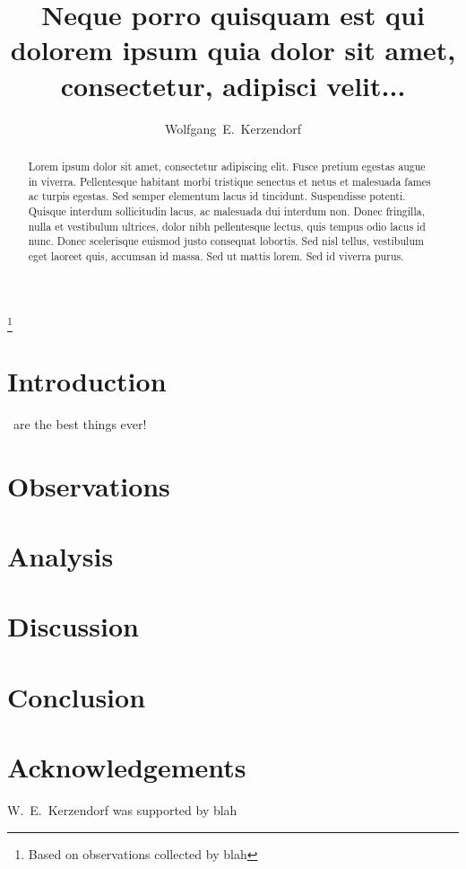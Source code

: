 \documentclass[manuscript]{aastex}
\begin{document}
\title{Neque porro quisquam est qui dolorem ipsum quia dolor sit amet, consectetur, adipisci velit...}
\footnote{Based on observations collected by blah}

\author{Wolfgang~E.~Kerzendorf} 




\begin{abstract}
Lorem ipsum dolor sit amet, consectetur adipiscing elit. Fusce pretium egestas augue in viverra. Pellentesque habitant morbi tristique senectus et netus et malesuada fames ac turpis egestas. Sed semper elementum lacus id tincidunt. Suspendisse potenti. Quisque interdum sollicitudin lacus, ac malesuada dui interdum non. Donec fringilla, nulla et vestibulum ultrices, dolor nibh pellentesque lectus, quis tempus odio lacus id nunc. Donec scelerisque euismod justo consequat lobortis. Sed nisl tellus, vestibulum eget laoreet quis, accumsan id massa. Sed ut mattis lorem. Sed id viverra purus.
\end{abstract}


\maketitle

\section{Introduction}

\sneia\ are the best things ever!


\section{Observations}

\section{Analysis}

\section{Discussion}

\section{Conclusion}

\section{Acknowledgements}

W.~E.~Kerzendorf was supported by blah



\end{document}
